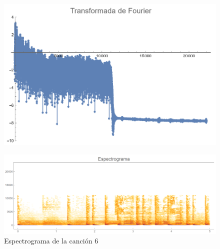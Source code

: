 \documentclass[12pt, letterpaper]{article}
\begin{document}
\begin{figure}[H]
  \centering
  \begin{minipage}{.4\linewidth}
    \centering
    \includegraphics[width=\linewidth]{imgs/Cancion6/transformada.png}
    \label{fig:06a}
  \end{minipage}
  \begin{minipage}{0.07\textwidth}\end{minipage}
  \begin{minipage}{.47\linewidth}
    \centering
    \includegraphics[width=\linewidth]{imgs/Cancion6/espectrograma.png}
    \caption{Espectrograma de la canción 6}
    \label{fig:06i}
  \end{minipage}
\end{figure}
\end{document}
